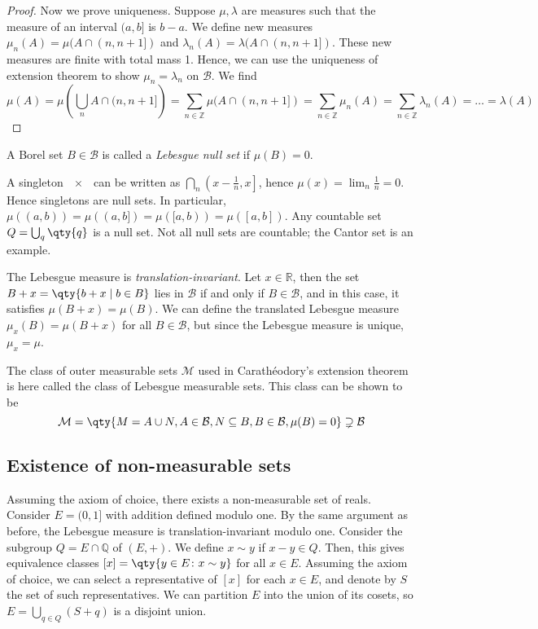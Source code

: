 \begin{proof}
	Now we prove uniqueness.
	Suppose $\mu, \lambda$ are measures such that the measure of an interval $(a,b]$ is $b - a$.
	We define new measures $\mu_n(A) = \mu(A \cap (n,n+1])$ and $\lambda_n(A) = \lambda(A \cap (n,n+1])$.
	These new measures are finite with total mass 1.
	Hence, we can use the uniqueness of extension theorem to show $\mu_n = \lambda_n$ on $\mathcal B$.
	We find
	\[ \mu(A) = \mu\left(\bigcup_n A \cap (n,n+1]\right) = \sum_{n \in \mathbb Z} \mu(A \cap (n,n+1]) = \sum_{n \in \mathbb Z} \mu_n(A) = \sum_{n \in \mathbb Z} \lambda_n(A) = \dots = \lambda(A) \]
\end{proof}

\begin{definition}
	A Borel set $B \in \mathcal B$ is called a \emph{Lebesgue null set} if $\mu(B) = 0$.
\end{definition}

\begin{remark}
	A singleton $\qty{x}$ can be written as $\bigcap_n \left(x-\frac 1n, x\right]$, hence $\mu({x}) = \lim_n \frac 1n = 0$.
	Hence singletons are null sets.
	In particular, $\mu((a,b)) = \mu((a,b]) = \mu([a,b)) = \mu([a,b])$.
	Any countable set $Q = \bigcup_q \qty{q}$ is a null set.
	Not all null sets are countable; the Cantor set is an example.

	The Lebesgue measure is \emph{translation-invariant}.
	Let $x \in \mathbb R$, then the set $B + x = \qty{b + x \mid b \in B}$ lies in $\mathcal B$ if and only if $B \in \mathcal B$, and in this case, it satisfies $\mu(B + x) = \mu(B)$.
	We can define the translated Lebesgue measure $\mu_x(B) = \mu(B + x)$ for all $B \in \mathcal B$, but since the Lebesgue measure is unique, $\mu_x = \mu$.

	The class of outer measurable sets $\mathcal M$ used in Carath\'eodory's extension theorem is here called the class of Lebesgue measurable sets.
	This class can be shown to be
	\[ \mathcal M = \qty{ M = A \cup N, A \in \mathcal B, N \subseteq B, B \in \mathcal B, \mu(B) = 0 } \supsetneq \mathcal B \]
\end{remark}

\subsection{Existence of non-measurable sets}
Assuming the axiom of choice, there exists a non-measurable set of reals.
Consider $E = (0,1]$ with addition defined modulo one.
By the same argument as before, the Lebesgue measure is translation-invariant modulo one.
Consider the subgroup $Q = E \cap \mathbb Q$ of $(E, +)$.
We define $x \sim y$ if $x - y \in Q$.
Then, this gives equivalence classes $[x] = \qty{y \in E \colon x \sim y}$ for all $x \in E$.
Assuming the axiom of choice, we can select a representative of $[x]$ for each $x \in E$, and denote by $S$ the set of such representatives.
We can partition $E$ into the union of its cosets, so $E = \bigcup_{q \in Q} (S + q)$ is a disjoint union.

